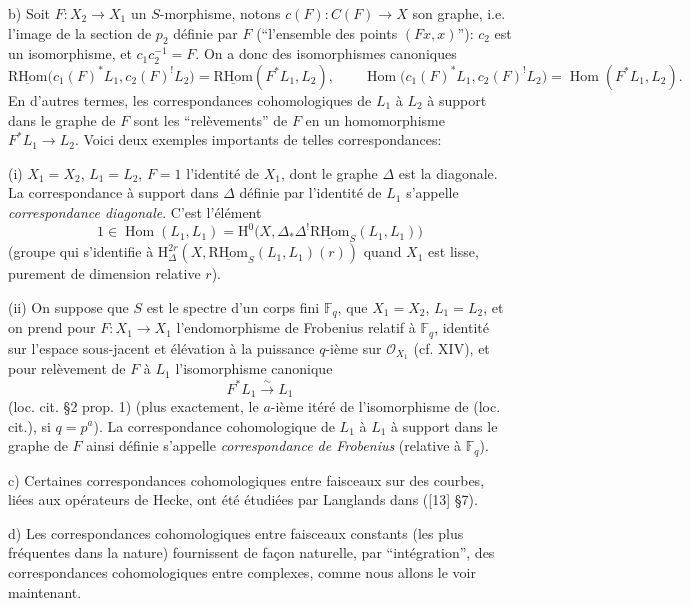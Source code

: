 \documentclass[11pt]{article}
\renewcommand{\H}{\mathrm{H}}
\DeclareMathOperator{\Hom}{Hom}
\providecommand{\RHom}{\mathrm{RHom}}
\providecommand{\uRHom}{\underline{\RHom}}
\providecommand{\RHom}{\mathrm{RHom}}
\providecommand{\Hom}{\operatorname{Hom}}
\providecommand{\RHom}{\mathrm R\mathcal{H}om}
\providecommand{\RHom}{\mathrm{RHom}}
\providecommand{\Hom}{\operatorname{Hom}}
\begin{document}
b) Soit $F:X_2\to X_1$ un $S$-morphisme, notons $c(F):C(F)\to X$ son graphe, i.e. l'image de la section de $p_2$ définie par $F$ (``l'ensemble des points $(Fx,x)$''): $c_2$ est un isomorphisme, et $c_1c_2^{-1}=F$. On a donc des isomorphismes canoniques
\begin{equation}
\uRHom\bigl(c_1(F)^*L_1,c_2(F)^!L_2\bigr)=\uRHom(F^*L_1,L_2),
\qquad
\Hom\bigl(c_1(F)^*L_1,c_2(F)^!L_2\bigr)=\Hom(F^*L_1,L_2).
\tag{3.2.6}
\end{equation}
En d'autres termes, les correspondances cohomologiques de $L_1$ à $L_2$ à support dans le graphe de $F$ sont les ``relèvements'' de $F$ en un homomorphisme $F^*L_1\to L_2$. Voici deux exemples importants de telles correspondances:

(i) $X_1=X_2$, $L_1=L_2$, $F=1$ l'identité de $X_1$, dont le graphe $\Delta$ est la diagonale. La correspondance à support dans $\Delta$ définie par l'identité de $L_1$ s'appelle \emph{correspondance diagonale}. C'est l'élément
\[
1\in \Hom(L_1,L_1)=\H^0\bigl(X,\Delta_*\Delta^!\uRHom_S(L_1,L_1)\bigr)
\]
(groupe qui s'identifie à $\H^{2r}_\Delta(X,\uRHom_S(L_1,L_1)(r))$ quand $X_1$ est lisse, purement de dimension relative $r$).

(ii) On suppose que $S$ est le spectre d'un corps fini $\mathbb F_q$, que $X_1=X_2$, $L_1=L_2$, et on prend pour $F:X_1\to X_1$ l'endomorphisme de Frobenius relatif à $\mathbb F_q$, identité sur l'espace sous-jacent et élévation à la puissance $q$-ième sur $\mathcal O_{X_1}$ (cf. XIV), et pour relèvement de $F$ à $L_1$ l'isomorphisme canonique
\[
F^*L_1\xrightarrow{\sim}L_1
\]
(loc. cit. §2 prop. 1) (plus exactement, le $a$-ième itéré de l'isomorphisme de (loc. cit.), si $q=p^a$). La correspondance cohomologique de $L_1$ à $L_1$ à support dans le graphe de $F$ ainsi définie s'appelle \emph{correspondance de Frobenius} (relative à $\mathbb F_q$).

c) Certaines correspondances cohomologiques entre faisceaux sur des courbes, liées aux opérateurs de Hecke, ont été étudiées par Langlands dans ([13] §7).

d) Les correspondances cohomologiques entre faisceaux constants (les plus fréquentes dans la nature) fournissent de façon naturelle, par ``intégration'', des correspondances cohomologiques entre complexes, comme nous allons le voir maintenant.
\end{document}
